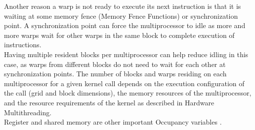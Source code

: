 	Another reason a warp is not ready to execute its next instruction is that it is waiting at some memory fence (Memory Fence Functions) or synchronization point. A synchronization point can force the multiprocessor to idle as	more and more warps wait for other warps in the same block to complete execution of instructions.\\
	Having multiple resident blocks per multiprocessor can help reduce idling in this case, as warps from different blocks do not	need to wait for each other at synchronization points.
	The number of blocks and warps residing on each multiprocessor for a given kernel call depends on the execution configuration of the call (grid and block dimensions), the memory resources of the multiprocessor, and the resource requirements of the kernel as described in Hardware Multithreading.\\
	Register and shared memory are other important Occupancy variables \cite{cudaguide}.\\\\


